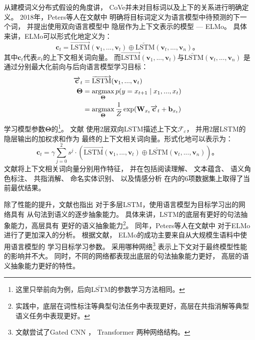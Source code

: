 从建模词义分布式假设的角度讲，
CoVe并未对目标词以及上下的关系进行明确定义。
2018年，Peters等人在文献中
明确将目标词定义为语言模型中待预测的下一个词，
并提出使用双向语言模型中
隐层作为上下文表示的模型 --- ELMo。
具体来讲，ELMo可以形式化地定义为：
\[
\mathbf{c}_t = \overrightarrow{\text{LSTM}}(\mathbf{v}_{1}, ..., \mathbf{v}_{t}) \oplus \overleftarrow{\text{LSTM}}(\mathbf{v}_{t}, ..., \mathbf{v}_{n})\text{。}
\]
其中$\mathbf{c}_t$代表$x_t$的上下文相关词向量。
而$\overrightarrow{\text{LSTM}}(\mathbf{v}_{1}, ..., \mathbf{v}_{t})$与$\overleftarrow{\text{LSTM}}(\mathbf{v}_{t}, ..., \mathbf{v}_{n})$
是通过分别最大化前向与后向语言模型学习目标：
\begin{align*}
\overrightarrow{\mathbf{c}}_t &=\overrightarrow{\text{LSTM}}(\mathbf{v}_{1}, ..., \mathbf{v}_{t})\\
\mathbf{\Theta} &= \operatorname*{argmax}_{\mathbf{\Theta}} p(y = x_{t+1} \mid x_{1}, ..., x_{t} ) \\
 & = \operatorname*{argmax}_{\mathbf{\Theta}} \frac{1}{Z}\exp( \mathbf{W}_{x_{t}} \overrightarrow{\mathbf{c}}_t + \mathbf{b}_{x_{t}})
\end{align*}
学习模型参数$\mathbf{\Theta}$的\footnote{这里只举前向为例，后向$\overleftarrow{\text{LSTM}}$的参数学习方法相同。}。
文献
使用2层双向LSTM描述上下文$\mathcal{F}_c$，
并用2层LSTM的隐层输出的加权求和作为
最终的上下文相关词向量。形式化地可以表示为：
\[
\mathbf{c}_t = \gamma \sum_{j=0}^2 s^j \cdot (\overrightarrow{\text{LSTM}}(\mathbf{v}_{1}, ..., \mathbf{v}_{t}) \oplus \overleftarrow{\text{LSTM}}(\mathbf{v}_{t}, ..., \mathbf{v}_{n}))\text{。}
\]
文献将上下文相关词向量分别用作特征，
并在包括阅读理解\cite{rajpurkar-EtAl:2016:EMNLP2016}、
文本蕴含\cite{bowman-EtAl:2015:EMNLP}、
语义角色标注、
共指消解、
命名实体识别\cite{TjongKimSang-DeMeulder:2003:CONLL}、
以及情感分析\cite{socher-EtAl:2013:ACL2013}
在内的6项数据集上取得了当前最优结果。

除了性能的提升，文献也指出
对于多层LSTM，使用语言模型为目标学习出的网络具有
从句法到语义的逐步抽象能力。
具体来讲，LSTM的底层有更好的句法抽象能力，高层具有
更好的语义抽象能力\footnote{实践中，底层在词性标注等典型句法任务中表现更好，高层在共指消解等典型语义任务中表现更好。}。
同年，Peters等人在文献中
对于ELMo进行了更加深入的分析。
根据文献，
ELMo的成功主要来自从大规模生语料中使用语言模型的
学习目标学习参数。
采用哪种网络\footnote{文献尝试了Gated CNN \cite{pmlr-v70-dauphin17a}，
	Transformer \cite{NIPS2017_7181}两种网络结构。}
表示上下文对于最终模型性能的影响并不大。
同时，不同的网络都表现出底层的句法抽象能力更好，
高层的语义抽象能力更好的特性。

